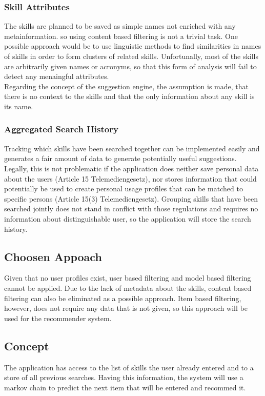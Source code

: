 \subsubsection{Skill Attributes}
The skills are planned to be saved as simple names not enriched with any metainformation. so using content based filtering is not a trivial task. One possible approach would be to use linguistic methods to find similarities in names of skills in order to form clusters of related skills. Unfortunally, most of the skills are arbitrarily given names or acronyms, so that this form of analysis will fail to detect any menaingful attributes.\\
Regarding the concept of the suggestion engine, the assumption is made, that there is no context to the skills and that the only information about any skill is its name.

\subsubsection{Aggregated Search History}
Tracking which skills have been searched together can be implemented easily and generates a fair amount of data to generate potentially useful suggestions. Legally, this is not problematic if the application does neither save personal data about the users (Article 15 Telemediengesetz), nor stores information that could potentially be used to create personal usage profiles that can be matched to specific persons (Article 15(3) Telemediengesetz). Grouping skills that have been searched jointly does not stand in conflict with those regulations and requires no information about distinguishable user, so the application will store the search history.

\subsection{Choosen Appoach}
Given that no user profiles exist, user based filtering and model based filtering cannot be applied. Due to the lack of metadata about the skills, content based filtering can also be eliminated as a possible approach. Item based filtering, however, does not require any data that is not given, so this approach will be used for the recommender system.

\subsection{Concept}
The application has access to the list of skills the user already entered and to a store of all previous searches. Having this information, the system will use a markov chain to predict the next item that will be entered and recommed it.

